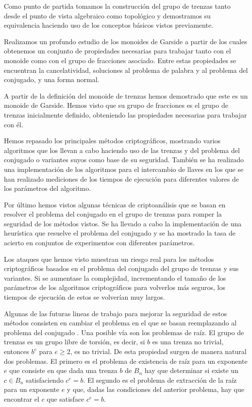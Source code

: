 \documentclass[12pt]{book}
\theoremstyle{definition}
\begin{document}
Como punto de partida tomamos la construcción del grupo de trenzas tanto desde el punto de vista algebraico como topológico y demostramos su equivalencia haciendo uso de los conceptos básicos vistos previamente.

Realizamos un profundo estudio de los monoides de Garside a partir de los cuales obtenemos un conjunto de propiedades necesarias para trabajar tanto con el monoide como con el grupo de fracciones asociado. Entre estas propiedades se encuentran la cancelatividad, soluciones al problema de palabra y al problema del conjugado, y una forma normal.

A partir de la definición del monoide de trenzas hemos demostrado que este es un monoide de Garside. Hemos visto que su grupo de fracciones es el grupo de trenzas inicialmente definido, obteniendo las propiedades necesarias para trabajar con él.

Hemos repasado los principales métodos criptográficos, mostrando varios algoritmos que los llevan a cabo haciendo uso de las trenzas y del problema del conjugado o variantes suyos como base de su seguridad. También se ha realizado una implementación de los algoritmos para el intercambio de llaves en los que se han realizado mediciones de los tiempos de ejecución para diferentes valores de los parámetros del algoritmo.

Por último hemos vistos algunas técnicas de criptoanálisis que se basan en resolver el problema del conjugado en el grupo de trenzas para romper la seguridad de los métodos vistos. Se ha llevado a cabo la implementación de una heurística que resuelve el problema del conjugado y se ha mostrado la tasa de acierto en conjuntos de experimentos con diferentes parámetros.

Los ataques que hemos visto muestran un riesgo real para los métodos criptográficos basados en el problema del conjugado del grupo de trenzas y sus variantes. Si se aumentase la complejidad, incrementando el tamaño de los parámetros de los algoritmos criptográficos para volverlos más seguros, los tiempos de ejecución de estos se volverían muy largos.

Algunas de las futuras lineas de trabajo para mejorar la seguridad de estos métodos consisten en cambiar el problema en el que se basan reemplazando al problema del conjugado \cite{Deh}. Una posible vía son los problemas de raíz. El grupo de trenzas es un grupo libre de torsión, es decir, si $b$ es una trenza no trivial, entonces $b^e$ para $e\geq 2$, es no trivial. De esta propiedad surgen de manera natural dos problemas. El primero es el problema de existencia de raíz para un exponente $e$ que consiste en que dada una trenza $b$ de $B_n$ hay que determinar si existe un $c\in B_n$ satisfaciendo $c^e=b$. El segundo  es el problema de extracción de la raíz para un exponente $e$ y que, dadas las condiciones del anterior problema, hay que encontrar  el $c$ que satisface $c^e=b$.
\end{document}
